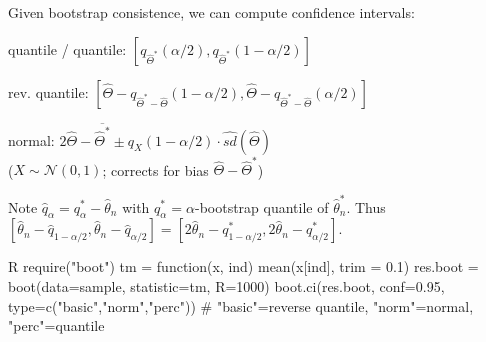 \begin{sectionbox}\nospacing{}
  Given bootstrap consistence, we can compute confidence intervals: 
  \begin{enumeratenosep}[label=\roman*]
    \item quantile / quantile: $ [q_{\hat{\Theta}^{\ast}}(\alpha/2), q_{\hat{\Theta}^{\ast}}(1-\alpha/2)]  $
    \item rev. quantile: $ [\hat{\Theta} - q_{\hat{\Theta}^{\ast}-\hat{\Theta}}(1-\alpha/2), \hat{\Theta} - q_{\hat{\Theta}^{\ast}-\hat{\Theta}}(\alpha/2)]   $
    \item normal: $2\hat{\Theta}-\overline{\hat{\Theta}^*} \pm q_X(1-\alpha/2)\cdot \hat{sd}(\hat{\Theta})$ \\ ($X \sim \mathcal{N}(0,1)$; corrects for bias $\hat{\Theta} - \hat{\Theta}^{\ast}$) 
  \end{enumeratenosep}
  Note $\hat q_\alpha  = q_\alpha^\ast - \hat \theta_n$ with $q_\alpha^\ast = \alpha$-bootstrap quantile of $\hat\theta_n^\ast$.
  Thus $[\hat\theta_n -\hat q_{1-\alpha/2},\hat \theta_n - \hat q_{\alpha/2}] = [2\hat \theta_n - q_{1-\alpha/2}^\ast, 2\hat\theta_n-q_{\alpha/2}^\ast]$.
\end{sectionbox}
\begin{mintlinebox}{R}
  require("boot")
  tm = function(x, ind) {mean(x[ind], trim = 0.1)}
  res.boot = boot(data=sample, statistic=tm, R=1000)
  boot.ci(res.boot, conf=0.95, type=c("basic","norm","perc"))
  # "basic"=reverse quantile, "norm"=normal, "perc"=quantile
\end{mintlinebox}


